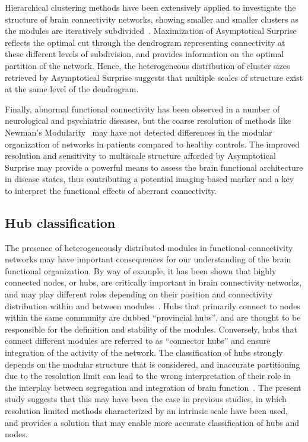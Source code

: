 Hierarchical clustering methods have been extensively applied to investigate the structure of brain connectivity networks, showing smaller and smaller clusters as the modules are iteratively subdivided~\cite{meunier2010}. Maximization of Asymptotical Surprise reflects the optimal cut through the dendrogram representing connectivity at these different levels of subdivision, and provides information on the optimal partition of the network. Hence, the heterogeneous distribution of cluster sizes retrieved by Asymptotical Surprise suggests that multiple scales of structure exist at the same level of the dendrogram.

Finally, abnormal functional connectivity has been observed in a number of neurological and psychiatric diseases, but the coarse resolution of methods like Newman's Modularity~\cite{fornito2015} may have not detected differences in the modular organization of networks in patients compared to healthy controls. The improved resolution and sensitivity to multiscale structure afforded by Asymptotical Surprise may provide a powerful means to assess the brain functional architecture in disease states, thus contributing a potential imaging-based marker and a key to interpret the functional effects of aberrant connectivity.
\subsection{Hub classification}
The presence of heterogeneously distributed modules in functional connectivity networks may have important consequences for our understanding of the brain functional organization. By way of example, it has been shown that highly connected nodes, or hubs, are critically important in brain connectivity networks, and may play different roles depending on their position and connectivity distribution within and between modules~\cite{bullmore2009}. Hubs that primarily connect to nodes within the same community are dubbed “provincial hubs”, and are thought to be responsible for the definition and stability of the modules. Conversely, hubs that connect different modules are referred to as “connector hubs” and ensure integration of the activity of the network. The classification of hubs strongly depends on the modular structure that is considered, and inaccurate partitioning due to the resolution limit can lead to the wrong interpretation of their role in the interplay between segregation and integration of brain function~\cite{bullmore2009}. The present study suggests that this may have been the case in previous studies, in which resolution limited methods characterized by an intrinsic scale have been used, and provides a solution that may enable more accurate classification of hubs and nodes.

